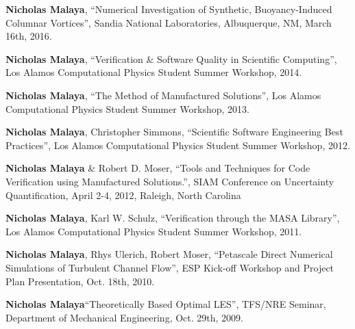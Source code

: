 \blankline

\textbf{Nicholas Malaya}, ``Numerical Investigation of Synthetic, Buoyancy-Induced Columnar Vortices'', Sandia National Laboratories, 
		 Albuquerque, NM, March 16th, 2016. 

\blankline

\textbf{Nicholas Malaya}, ``Verification \& Software Quality in Scientific
      Computing'', Los Alamos Computational Physics Student Summer
      Workshop, 2014. 

\blankline

\textbf{Nicholas Malaya}, ``The Method of Manufactured Solutions'', Los Alamos
      Computational Physics Student Summer Workshop, 2013.

\blankline

\textbf{Nicholas Malaya}, Christopher Simmons, ``Scientific Software Engineering
      Best Practices'', Los Alamos Computational Physics Student Summer
      Workshop, 2012.

\blankline

\textbf{Nicholas Malaya} \& Robert D. Moser, ``Tools and Techniques for Code
Verification using Manufactured Solutions.'', SIAM Conference on
Uncertainty Quantification, April 2-4, 2012, Raleigh, North Carolina 

\blankline

\textbf{Nicholas Malaya}, Karl W. Schulz, ``Verification through the MASA
      Library'', Los Alamos Computational Physics Student Summer
      Workshop, 2011.

\blankline

\textbf{Nicholas Malaya}, Rhys Ulerich, Robert Moser, ``Petascale Direct
Numerical Simulations of Turbulent Channel Flow'', ESP Kick-off
Workshop and Project Plan Presentation, Oct. 18th, 2010.

\blankline

\textbf{Nicholas Malaya}``Theoretically Based Optimal LES'', TFS/NRE
Seminar, Department of Mechanical Engineering, Oct. 29th, 2009. 


